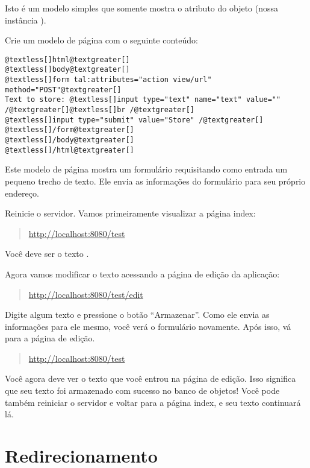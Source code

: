 \documentclass[a4paper,12pt,portuguese]{manual}
\begin{document}
Isto é um modelo simples que somente mostra o atributo  do
objeto  (nossa instância ).

Crie um modelo de página  com o seguinte conteúdo:

\begin{Verbatim}[commandchars=@\[\]]
@textless[]html@textgreater[]
@textless[]body@textgreater[]
@textless[]form tal:attributes="action view/url" method="POST"@textgreater[]
Text to store: @textless[]input type="text" name="text" value="" /@textgreater[]@textless[]br /@textgreater[]
@textless[]input type="submit" value="Store" /@textgreater[]
@textless[]/form@textgreater[]
@textless[]/body@textgreater[]
@textless[]/html@textgreater[]
\end{Verbatim}

Este modelo de página mostra um formulário requisitando como entrada
um pequeno trecho de texto. Ele envia as informações do formulário
para seu próprio endereço.

Reinicie o servidor. Vamos primeiramente visualizar a página index:
\begin{quote}

\href{http://localhost:8080/test}{http://localhost:8080/test}
\end{quote}

Você deve ser o texto .

Agora vamos modificar o texto acessando a página de edição da
aplicação:
\begin{quote}

\href{http://localhost:8080/test/edit}{http://localhost:8080/test/edit}
\end{quote}

Digite algum texto e pressione o botão ``Armazenar''. Como ele envia as
informações para ele mesmo, você verá o formulário novamente. Após
isso, vá para a página de edição.
\begin{quote}

\href{http://localhost:8080/test}{http://localhost:8080/test}
\end{quote}

Você agora deve ver o texto que você entrou na página de edição. Isso
significa que seu texto foi armazenado com sucesso no banco de
objetos!
Você pode também reiniciar o servidor e voltar para a página index, e
seu texto continuará lá.


\section{Redirecionamento}
\end{document}
